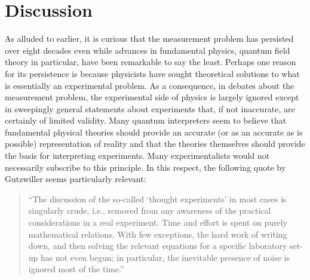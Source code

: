 \documentclass [12pt]{revtex4}
\begin{document}
\section{Discussion}\label{D}

As alluded to earlier, it is curious that the measurement problem
has persisted over eight decades even while advances in fundamental
physics, quantum field theory in particular, have been remarkable to
say the least. Perhaps one reason for its persistence is because
physicists have sought theoretical solutions to what is essentially
an experimental problem. As a consequence, in debates about the measurement problem,
the experimental side of physics is largely ignored except in
sweepingly general statements about experiments that, if not
inaccurate, are certainly of limited validity. Many quantum
interpreters seem to believe that fundamental physical theories
should provide an accurate (or as an accurate as is possible) representation of reality and that
the theories themselves should provide the basis for interpreting
experiments. Many experimentalists would not necessarily subscribe
to this principle. In this respect, the following quote by
Gutzwiller \cite{G1990}
seems particularly relevant:
\begin{quote}
``The discussion of the so-called `thought experiments' in most
cases is singularly crude, i.e., removed from any awareness of the
practical considerations in a real experiment. Time and effort is
spent on purely mathematical relations. With few exceptions, the
hard work of writing down, and then solving the relevant equations
for a specific laboratory set-up has not even begun; in particular,
the inevitable presence of noise is ignored most of the time.''
\end{quote}
\end{document}
